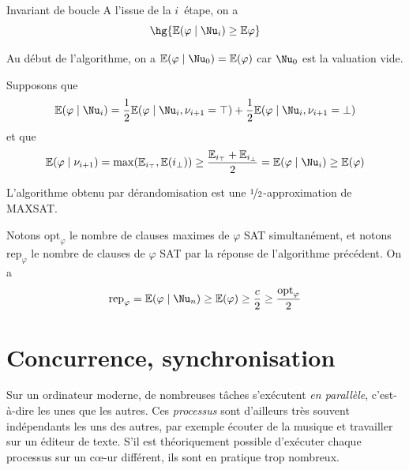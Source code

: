 \documentclass[a4paper,french,bookmarks]{book}
\begin{document}
    \begin{property}{Invariant de boucle}{}
        A l'issue de la $i$\ieme~étape, on a
        \[ \hg{\bdE\p{\varphi \enstq \Nu_i} \geq \bdE{\varphi}}\]
    \end{property}
   
    \begin{nproof}
        Au début de l'algorithme, on a $\bdE\p{\varphi \enstq \Nu_0} = \bdE\p{\varphi}$ car $\Nu_0$ est la valuation vide.
        
        \begin{enumerate}
            \itt Supposons que 
            \[ \bdE\p{\varphi \enstq \Nu_i} = \dfrac{1}{2}\bdE\p{\varphi \enstq \Nu_i, \nu_{i+1} = \top} + \dfrac{1}{2}\bdE\p{\varphi \enstq \Nu_i, \nu_{i+1} = \bot} \]
            et que 
            \[ \bdE\p{\varphi \enstq \nu_{i+1}} = \max{\bdE_{i_\top}, \bdE\p{i_\bot}} \geq \dfrac{\bdE_{i_\top} + \bdE_{i_\bot}}{2}= \bdE\p{\varphi \enstq \Nu_i} \geq \bdE\p{\varphi} \]
        \end{enumerate}
    \end{nproof}

    \begin{property}{}{}
        L'algorithme obtenu par dérandomisation est une $\nicefrac{1}{2}$-approximation de \textsf{MAXSAT}.
    \end{property}
    
    \begin{nproof}
        Notons $\text{opt}_\varphi$ le nombre de clauses maximes de $\varphi$ \textsf{SAT} simultanément, et notons $\textrm{rep}_\varphi$ le nombre de clauses de $\varphi$ \textsf{SAT} par la réponse de l'algorithme précédent. On a 
        \[ \textrm{rep}_\varphi = \bdE\p{\varphi \enstq \Nu_n} \geq \bdE\p{\varphi} \geq \dfrac{c}{2} \geq \dfrac{\textrm{opt}_\varphi}{2}\]
    \end{nproof}


    \chapter{Concurrence, synchronisation}
    
    Sur un ordinateur moderne, de nombreuses tâches s'exécutent \emph{en parallèle}, c'est-à-dire  les unes que les autres. Ces \emph{processus} sont d'ailleurs très souvent indépendants les uns des autres, par exemple écouter de la musique et travailler sur un éditeur de texte. S'il est théoriquement possible d'exécuter chaque processus sur un c\oe{}-ur différent, ils sont en pratique trop nombreux.\medskip
    
\end{document}
